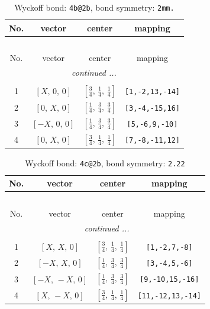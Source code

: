 \documentclass[fleqn,8pt]{jsarticle}
\begin{document}
\begin{longtable}{cccc}
\caption{Wyckoff bond: {\tt 4b@2b}, bond symmetry: {\tt 2mm.}}
 \\
 \hline \hline
No. & vector & center & mapping \\ \hline \endfirsthead

\multicolumn{3}{l}{\tablename\ \thetable{}} \\
 \hline \hline
No. & vector & center & mapping \\ \hline \endhead

 \hline \hline
\multicolumn{3}{r}{\footnotesize\it continued ...} \\ \endfoot

 \hline \hline
\multicolumn{3}{r}{} \\ \endlastfoot

1 & $\left[ X,\, 0,\, 0 \right]$ & $\left[ \frac{3}{4},\, \frac{1}{4},\, \frac{1}{4} \right]$ & {\tt [1,-2,13,-14]} \\ \hline
2 & $\left[ 0,\, X,\, 0 \right]$ & $\left[ \frac{1}{4},\, \frac{3}{4},\, \frac{3}{4} \right]$ & {\tt [3,-4,-15,16]} \\ \hline
3 & $\left[ - X,\, 0,\, 0 \right]$ & $\left[ \frac{1}{4},\, \frac{3}{4},\, \frac{3}{4} \right]$ & {\tt [5,-6,9,-10]} \\ \hline
4 & $\left[ 0,\, X,\, 0 \right]$ & $\left[ \frac{3}{4},\, \frac{1}{4},\, \frac{1}{4} \right]$ & {\tt [7,-8,-11,12]} \\
\end{longtable}
\renewcommand{\arraystretch}{1.2}
\begin{longtable}{cccc}
\caption{Wyckoff bond: {\tt 4c@2b}, bond symmetry: {\tt 2.22}}
 \\
 \hline \hline
No. & vector & center & mapping \\ \hline \endfirsthead

\multicolumn{3}{l}{\tablename\ \thetable{}} \\
 \hline \hline
No. & vector & center & mapping \\ \hline \endhead

 \hline \hline
\multicolumn{3}{r}{\footnotesize\it continued ...} \\ \endfoot

 \hline \hline
\multicolumn{3}{r}{} \\ \endlastfoot

1 & $\left[ X,\, X,\, 0 \right]$ & $\left[ \frac{3}{4},\, \frac{1}{4},\, \frac{1}{4} \right]$ & {\tt [1,-2,7,-8]} \\ \hline
2 & $\left[ - X,\, X,\, 0 \right]$ & $\left[ \frac{1}{4},\, \frac{3}{4},\, \frac{3}{4} \right]$ & {\tt [3,-4,5,-6]} \\ \hline
3 & $\left[ - X,\, - X,\, 0 \right]$ & $\left[ \frac{1}{4},\, \frac{3}{4},\, \frac{3}{4} \right]$ & {\tt [9,-10,15,-16]} \\ \hline
4 & $\left[ X,\, - X,\, 0 \right]$ & $\left[ \frac{3}{4},\, \frac{1}{4},\, \frac{1}{4} \right]$ & {\tt [11,-12,13,-14]} \\
\end{longtable}
\end{document}
